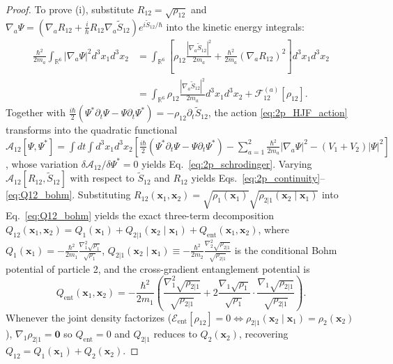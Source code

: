\documentclass[11pt, a4paper]{article}
\theoremstyle{definition}
\begin{document}
\begin{proof}
To prove (i), substitute $R_{12} = \sqrt{\rho_{12}}$ and $\nabla_a \Psi = (\nabla_a R_{12} + \frac{i}{\hbar}R_{12}\nabla_a \tilde{S}_{12})e^{i\tilde{S}_{12}/\hbar}$ into the kinetic energy integrals:
\begin{equation}
\begin{aligned}
\frac{\hbar^2}{2m_a}\int_{\mathbb{R}^6} |\nabla_a \Psi|^2 d^3x_1 d^3x_2 &= \int_{\mathbb{R}^6} \left[ \rho_{12}\frac{|\nabla_a \tilde{S}_{12}|^2}{2m_a} + \frac{\hbar^2}{2m_a}(\nabla_a R_{12})^2 \right] d^3x_1 d^3x_2 \\
&= \int_{\mathbb{R}^6} \rho_{12}\frac{|\nabla_a \tilde{S}_{12}|^2}{2m_a} d^3x_1 d^3x_2 + \mathcal{F}_{12}^{(a)}[\rho_{12}].
\end{aligned}
\end{equation}
Together with $\frac{i\hbar}{2}(\Psi^*\partial_t \Psi - \Psi\partial_t \Psi^*) = -\rho_{12}\partial_t \tilde{S}_{12}$, the action \eqref{eq:2p_HJF_action} transforms into the quadratic functional $\mathcal{A}_{12}[\Psi, \Psi^*] = \int dt \int d^3x_1 d^3x_2 [\frac{i\hbar}{2}(\Psi^*\partial_t \Psi - \Psi\partial_t\Psi^*) - \sum_{a=1}^2 \frac{\hbar^2}{2m_a}|\nabla_a \Psi|^2 - (V_1 + V_2)|\Psi|^2]$, whose variation $\delta \mathcal{A}_{12}/\delta \Psi^* = 0$ yields Eq.~\eqref{eq:2p_schrodinger}. Varying $\mathcal{A}_{12}[R_{12}, \tilde{S}_{12}]$ with respect to $\tilde{S}_{12}$ and $R_{12}$ yields Eqs.~\eqref{eq:2p_continuity}--\eqref{eq:Q12_bohm}. Substituting $R_{12}(\mathbf{x}_1, \mathbf{x}_2) = \sqrt{\rho_1(\mathbf{x}_1)}\sqrt{\rho_{2|1}(\mathbf{x}_2 \mid \mathbf{x}_1)}$ into Eq.~\eqref{eq:Q12_bohm} yields the exact three-term decomposition $Q_{12}(\mathbf{x}_1, \mathbf{x}_2) = Q_1(\mathbf{x}_1) + Q_{2|1}(\mathbf{x}_2 \mid \mathbf{x}_1) + Q_{\text{ent}}(\mathbf{x}_1, \mathbf{x}_2)$, where $Q_1(\mathbf{x}_1) = -\frac{\hbar^2}{2m_1}\frac{\nabla_1^2\sqrt{\rho_1}}{\sqrt{\rho_1}}$, $Q_{2|1}(\mathbf{x}_2 \mid \mathbf{x}_1) \equiv -\frac{\hbar^2}{2m_2}\frac{\nabla_2^2\sqrt{\rho_{2|1}}}{\sqrt{\rho_{2|1}}}$ is the conditional Bohm potential of particle 2, and the cross-gradient entanglement potential is
\begin{equation}
Q_{\text{ent}}(\mathbf{x}_1, \mathbf{x}_2) = -\frac{\hbar^2}{2m_1}\left( \frac{\nabla_1^2 \sqrt{\rho_{2|1}}}{\sqrt{\rho_{2|1}}} + 2\frac{\nabla_1 \sqrt{\rho_1}}{\sqrt{\rho_1}}\cdot \frac{\nabla_1 \sqrt{\rho_{2|1}}}{\sqrt{\rho_{2|1}}} \right).
\end{equation}
Whenever the joint density factorizes ($\mathcal{E}_{\text{ent}}[\rho_{12}] = 0 \iff \rho_{2|1}(\mathbf{x}_2 \mid \mathbf{x}_1) = \rho_2(\mathbf{x}_2)$), $\nabla_1\rho_{2|1} = \mathbf{0}$ so $Q_{\text{ent}} = 0$ and $Q_{2|1}$ reduces to $Q_2(\mathbf{x}_2)$, recovering $Q_{12} = Q_1(\mathbf{x}_1) + Q_2(\mathbf{x}_2)$.


\end{proof}
\end{document}
